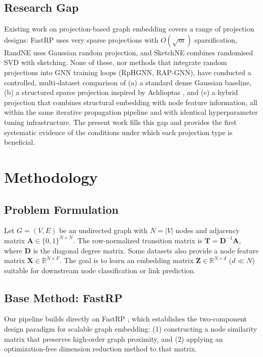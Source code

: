 \documentclass[conference]{IEEEtran}
\begin{document}
\subsection{Research Gap}

Existing work on projection-based graph embedding covers a range of
projection designs: FastRP \cite{chen2019fast} uses very sparse
projections with $O(\sqrt{m})$ sparsification, RandNE \cite{zhang2018randne}
uses Gaussian random projection, and SketchNE \cite{xie2023sketchne}
combines randomised SVD with sketching. None of these, nor methods that
integrate random projections into GNN training loops (RpHGNN, RAP-GNN),
have conducted a controlled, multi-dataset comparison of
(a) a standard dense Gaussian baseline,
(b) a structured sparse projection inspired by Achlioptas \cite{achlioptas2003},
and (c) a hybrid projection that combines structural embedding with node
feature information, all within the same iterative propagation pipeline
and with identical hyperparameter tuning infrastructure.
The present work fills this gap and provides the first systematic evidence
of the conditions under which each projection type is beneficial.

\section{Methodology}
\label{sec:method}

\subsection{Problem Formulation}

Let $G = (V, E)$ be an undirected graph with $N = |V|$ nodes and adjacency
matrix $\mathbf{A} \in \{0,1\}^{N \times N}$. The row-normalized transition
matrix is $\mathbf{T} = \mathbf{D}^{-1}\mathbf{A}$, where $\mathbf{D}$ is
the diagonal degree matrix. Some datasets also provide a node feature matrix
$\mathbf{X} \in \mathbb{R}^{N \times F}$. The goal is to learn an embedding
matrix $\mathbf{Z} \in \mathbb{R}^{N \times d}$ ($d \ll N$) suitable for
downstream node classification or link prediction.

\subsection{Base Method: FastRP}
\label{subsec:fastrp-base}

Our pipeline builds directly on FastRP \cite{chen2019fast}, which establishes
the two-component design paradigm for scalable graph embedding: (1)
constructing a node similarity matrix that preserves high-order graph
proximity, and (2) applying an optimization-free dimension reduction method
to that matrix.
\end{document}
